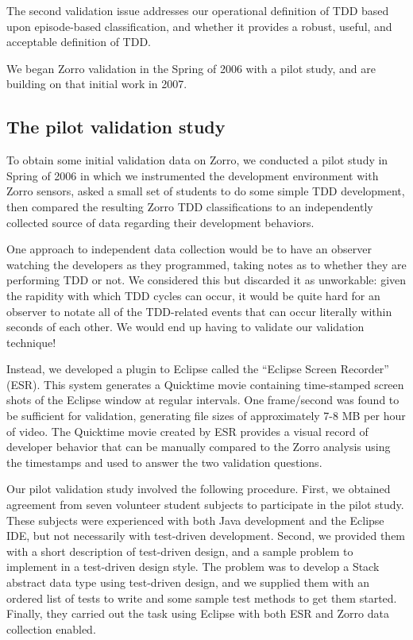 \documentclass[smallextended]{svjour3}     %
\begin{document}
The second validation issue addresses our operational definition of TDD
based upon episode-based classification, and whether it provides a robust,
useful, and acceptable definition of TDD.

We began Zorro validation in the Spring of 2006 with a pilot study, and 
are building on that initial work in 2007.

\subsection{The pilot validation study}

To obtain some initial validation data on Zorro, we conducted a pilot study
in Spring of 2006 in which we instrumented the development environment with
Zorro sensors, asked a small set of students to do some simple TDD
development, then compared the resulting Zorro TDD classifications to an
independently collected source of data regarding their development
behaviors.

One approach to independent data collection would be to have an observer
watching the developers as they programmed, taking notes as to whether they
are performing TDD or not.  We considered this but discarded it as
unworkable: given the rapidity with which TDD cycles can occur, it would be
quite hard for an observer to notate all of the TDD-related events that can
occur literally within seconds of each other. We would end up having to
validate our validation technique!

Instead, we developed a plugin to Eclipse called the ``Eclipse
Screen Recorder'' (ESR).  This system generates a Quicktime movie
containing time-stamped screen shots of the Eclipse window at regular
intervals. One frame/second was found to be sufficient for validation,
generating file sizes of approximately 7-8 MB per hour of video.  The
Quicktime movie created by ESR provides a visual record of developer
behavior that can be manually compared to the Zorro analysis using the
timestamps and used to answer the two validation questions.

Our pilot validation study involved the following procedure. First, we
obtained agreement from seven volunteer student subjects to participate in
the pilot study. These subjects were experienced with both Java development
and the Eclipse IDE, but not necessarily with test-driven development.
Second, we provided them with a short description of test-driven design,
and a sample problem to implement in a test-driven design style.  The
problem was to develop a Stack abstract data type using test-driven design,
and we supplied them with an ordered list of tests to write and some sample
test methods to get them started.  Finally, they carried out the task using
Eclipse with both ESR and Zorro data collection enabled.
\end{document}
